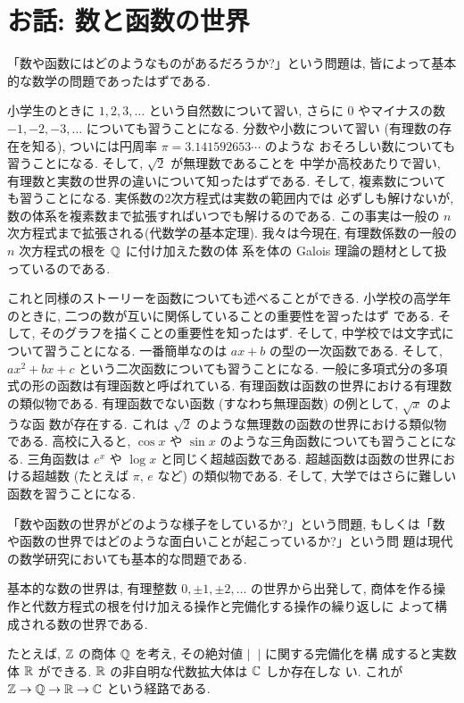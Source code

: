 \documentclass[12pt,twoside]{jarticle}
\begin{document}
\section{お話: 数と函数の世界}

「数や函数にはどのようなものがあるだろうか?」という問題は, 
皆によって基本的な数学の問題であったはずである.

小学生のときに $1,2,3,\ldots$ という自然数について習い, 
さらに $0$ やマイナスの数 $-1,-2,-3,\ldots$ についても習うことになる.
分数や小数について習い (有理数の存在を知る), 
ついには円周率 $\pi=3.141592653{\cdots}$ のような
おそろしい数についても習うことになる.  
そして, $\sqrt{2}$ が無理数であることを
中学か高校あたりで習い, 有理数と実数の世界の違いについて知ったはずである.  
そして, 複素数についても習うことになる.  実係数の2次方程式は実数の範囲内では
必ずしも解けないが, 数の体系を複素数まで拡張すればいつでも解けるのである.
この事実は一般の $n$ 次方程式まで拡張される(代数学の基本定理). 
我々は今現在, 有理数係数の一般の $n$ 次方程式の根を ${\mathbb Q}$ に付け加えた数の体
系を体の Galois 理論の題材として扱っているのである.

これと同様のストーリーを函数についても述べることができる.
小学校の高学年のときに, 二つの数が互いに関係していることの重要性を習ったはず
である.  そして, そのグラフを描くことの重要性を知ったはず.
そして, 中学校では文字式について習うことになる. 
一番簡単なのは $ax+b$ の型の一次函数である.
そして, $ax^2+bx+c$ という二次函数についても習うことになる.
一般に多項式分の多項式の形の函数は有理函数と呼ばれている.
有理函数は函数の世界における有理数の類似物である. 
有理函数でない函数 (すなわち無理函数) の例として, $\sqrt{x}$ のような函
数が存在する. これは $\sqrt{2}$ のような無理数の函数の世界における類似物である.
高校に入ると, $\cos x$ や $\sin x$ のような三角函数についても習うことになる.
三角函数は $e^x$ や $\log x$ と同じく超越函数である.
超越函数は函数の世界における超越数 (たとえば $\pi$, $e$ など) の類似物である.
そして, 大学ではさらに難しい函数を習うことになる.

「数や函数の世界がどのような様子をしているか?」という問題,
もしくは「数や函数の世界ではどのような面白いことが起こっているか?」という問
題は現代の数学研究においても基本的な問題である.

基本的な数の世界は, 有理整数 $0,\pm1,\pm2,\ldots$ の世界から出発して, 
商体を作る操作と代数方程式の根を付け加える操作と完備化する操作の繰り返しに
よって構成される数の世界である.

たとえば, ${\mathbb Z}$ の商体 ${\mathbb Q}$ を考え, その絶対値 $|\;\;|$ に関する完備化を構
成すると実数体 ${\mathbb R}$ ができる. ${\mathbb R}$ の非自明な代数拡大体は ${\mathbb C}$ しか存在しな
い. これが ${\mathbb Z} \to {\mathbb Q} \to {\mathbb R} \to {\mathbb C}$ という経路である.
\end{document}
